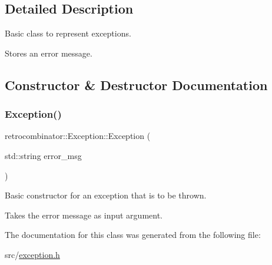 \subsection{Detailed Description}
Basic class to represent exceptions. 

Stores an error message. 

\subsection{Constructor \& Destructor Documentation}
\mbox{\label{classretrocombinator_1_1Exception_a38af9a2c673fc0884cc491e5688ed6b5}} 
\subsubsection{\texorpdfstring{Exception()}{Exception()}}
{\footnotesize\ttfamily retrocombinator\+::\+Exception\+::\+Exception (\begin{DoxyParamCaption}\item[{std\+::string}]{error\+\_\+msg }\end{DoxyParamCaption})\hspace{0.3cm}{\ttfamily [inline]}}



Basic constructor for an exception that is to be thrown. 

Takes the error message as input argument. 

The documentation for this class was generated from the following file\+:\begin{DoxyCompactItemize}
\item 
src/\hyperlink{exception_8h}{exception.\+h}\end{DoxyCompactItemize}

